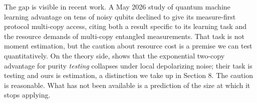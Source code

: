 The gap is visible in recent work. A May 2026 study of quantum machine learning advantage on tens
of noisy qubits \cite{qmladvantage2026} declined to give its measure-first protocol multi-copy
access, citing both a result specific to its learning task and the resource demands of multi-copy
entangled measurements. That task is not moment estimation, but the caution about resource cost is
a premise we can test quantitatively. On the theory side, \cite{noisylearning2026} shows that the
exponential two-copy advantage for purity \emph{testing} collapses under local depolarizing noise;
their task is testing and ours is estimation, a distinction we take up in Section 8. The caution
is reasonable. What has not been available is a prediction of the size at which it stops applying.
